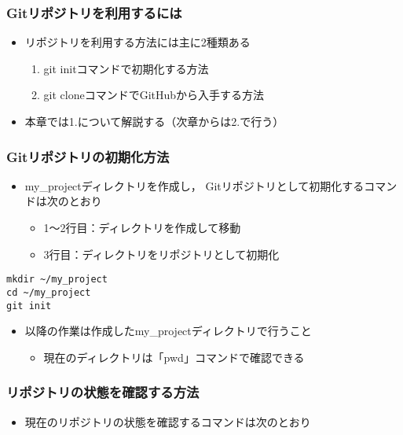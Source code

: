 \documentclass[a4paper,twoside,twocolumn]{bxjsarticle}
\begin{document}
\subsubsection{Gitリポジトリを利用するには}
\label{sec-1-2-2}
\begin{itemize}
\item リポジトリを利用する方法には主に2種類ある
\begin{enumerate}
\item git initコマンドで初期化する方法
\item git cloneコマンドでGitHubから入手する方法
\end{enumerate}
\item 本章では1.について解説する（次章からは2.で行う）
\end{itemize}

\subsubsection{Gitリポジトリの初期化方法}
\label{sec-1-2-3}
\begin{itemize}
\item my\_projectディレクトリを作成し，
  Gitリポジトリとして初期化するコマンドは次のとおり
\begin{itemize}
\item 1〜2行目：ディレクトリを作成して移動
\item 3行目：ディレクトリをリポジトリとして初期化
\end{itemize}
\end{itemize}

\begin{verbatim}
mkdir ~/my_project
cd ~/my_project
git init
\end{verbatim}

\begin{itemize}
\item 以降の作業は作成したmy\_projectディレクトリで行うこと
\begin{itemize}
\item 現在のディレクトリは「pwd」コマンドで確認できる
\end{itemize}
\end{itemize}

\subsubsection{リポジトリの状態を確認する方法}
\label{sec-1-2-4}
\begin{itemize}
\item 現在のリポジトリの状態を確認するコマンドは次のとおり
\end{itemize}
\end{document}
